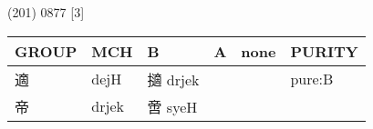 \documentclass[14pt,a4paper]{scrartcl}
\begin{document}
(201) 0877 {[}3{]}

\begin{longtable}[c]{@{}llllll@{}}
\toprule
\begin{minipage}[b]{0.14\columnwidth}\raggedright\strut
GROUP
\strut\end{minipage} &
\begin{minipage}[b]{0.14\columnwidth}\raggedright\strut
MCH
\strut\end{minipage} &
\begin{minipage}[b]{0.14\columnwidth}\raggedright\strut
B
\strut\end{minipage} &
\begin{minipage}[b]{0.14\columnwidth}\raggedright\strut
A
\strut\end{minipage} &
\begin{minipage}[b]{0.14\columnwidth}\raggedright\strut
none
\strut\end{minipage} &
\begin{minipage}[b]{0.14\columnwidth}\raggedright\strut
PURITY
\strut\end{minipage}\tabularnewline
\midrule
\endhead
\begin{minipage}[t]{0.14\columnwidth}\raggedright\strut
適
\strut\end{minipage} &
\begin{minipage}[t]{0.14\columnwidth}\raggedright\strut
dejH
\strut\end{minipage} &
\begin{minipage}[t]{0.14\columnwidth}\raggedright\strut
擿 drjek
\strut\end{minipage} &
\begin{minipage}[t]{0.14\columnwidth}\raggedright\strut
\strut\end{minipage} &
\begin{minipage}[t]{0.14\columnwidth}\raggedright\strut
\strut\end{minipage} &
\begin{minipage}[t]{0.14\columnwidth}\raggedright\strut
pure:B
\strut\end{minipage}\tabularnewline
\begin{minipage}[t]{0.14\columnwidth}\raggedright\strut
帝
\strut\end{minipage} &
\begin{minipage}[t]{0.14\columnwidth}\raggedright\strut
drjek
\strut\end{minipage} &
\begin{minipage}[t]{0.14\columnwidth}\raggedright\strut
啻 syeH
\strut\end{minipage} &

\end{longtable}
\end{document}
